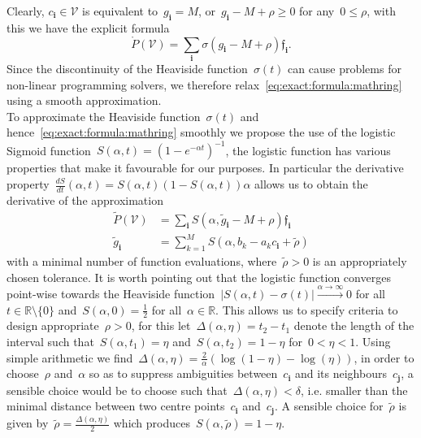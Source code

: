 \documentclass[letterpaper, 10pt, conference]{ieeeconf} %
\providecommand{\abs}[1]{\left\lvert#1\right\rvert}
\providecommand{\bfa}[1]{\mathbf{#1}}
\begin{document}
%
Clearly, $c_\bfa{i}\in\mathcal V$ is equivalent to~$g_\bfa{i}=M$, or~$g_\bfa{i}-M+\rho\geq0$ for any~$0\leq\rho$, with this we have the explicit formula
%
\begin{equation}\label{eq:exact:formula:mathring}
	\mathring{P}(\mathcal V) = \sum_{\bfa{i}}\sigma(g_\bfa{i}-M+\rho)\mathfrak f_\bfa{i}.
\end{equation}
%
Since the discontinuity of the Heaviside function~$\sigma(t)$ can cause problems for non-linear programming solvers, we therefore relax~\eqref{eq:exact:formula:mathring} using a smooth approximation.
%
\\[1em]
%
To approximate the Heaviside function~$\sigma(t)$ and hence~\eqref{eq:exact:formula:mathring} smoothly we propose the use of the logistic Sigmoid function~$S(\alpha,t) = (1-e^{-\alpha t})^{-1}$, the logistic function has various properties that make it favourable for our purposes.
%
In particular the derivative property~$\frac{dS}{dt}(\alpha,t)=S(\alpha,t)(1-S(\alpha,t))\alpha$ allows us to obtain the derivative of the approximation
%
\begin{equation}\label{eq:central:approximation:formula}
\begin{aligned}
\tilde{P}(\mathcal V) &= \sum_\bfa{i}S(\alpha,\tilde g_\bfa{i}-M+\rho)\mathfrak f_\bfa{i}\\
\tilde g_\bfa{i} &= \sum_{k=1}^M S(\alpha,b_k-a_k c_\bfa{i}+\tilde\rho)
\end{aligned}
\end{equation}
%
with a minimal number of function evaluations, where~$\tilde\rho>0$ is an appropriately chosen tolerance.
%
It is worth pointing out that the logistic function converges point-wise towards the Heaviside function~$\abs{S(\alpha,t)-\sigma(t)}\xrightarrow{\alpha\rightarrow\infty}0$ for all~$t\in\mathbb R\setminus\{0\}$ and~$S(\alpha,0)=\frac{1}{2}$ for all~$\alpha\in\mathbb R$.
%
This allows us to specify criteria to design appropriate~$\rho>0$, for this let~$\Delta(\alpha,\eta)=t_2-t_1$ denote the length of the interval such that~$S(\alpha,t_1)=\eta$ and~$S(\alpha,t_2)=1-\eta$ for~$0<\eta<1$.
%
Using simple arithmetic we find~$\Delta(\alpha,\eta)=\frac{2}{\alpha}(\log(1-\eta)-\log(\eta))$, in order to choose~$\rho$ and~$\alpha$ so as to suppress ambiguities between~$c_\bfa{i}$ and its neighbours~$c_\bfa{j}$, a sensible choice would be to choose such that~$\Delta(\alpha,\eta)<\delta$, i.e. smaller than the minimal distance between two centre points~$c_\bfa{i}$ and~$c_\bfa{j}$. 
%
A sensible choice for~$\tilde\rho$ is given by~$\tilde\rho=\frac{\Delta(\alpha,\eta)}{2}$ which produces~$S(\alpha,\tilde\rho)=1-\eta$.
\end{document}
